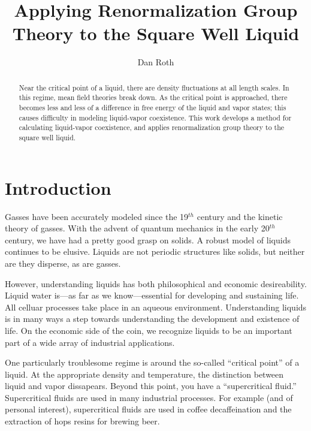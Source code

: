 \documentclass[letterpaper,twocolumn,amsmath,amssymb,prb]{revtex4-1}
\newcommand{\1}{\ensuremath{\textbf{r}_1}}
\newcommand{\2}{\ensuremath{\textbf{r}_2}}
\newcommand{\3}{\ensuremath{\textbf{r}_3}}
\newcommand{\4}{\ensuremath{\textbf{r}_4}}
\begin{document}
\title{Applying Renormalization Group Theory to the Square Well Liquid}

\author{Dan Roth}

\begin{abstract}

Near the critical point of a liquid, there are density fluctuations at
all length scales. In this regime, mean field theories break down. As
the critical point is approached, there becomes less and less of a
difference in free energy of the liquid and vapor states; this causes
difficulty in modeling liquid-vapor coexistence. This work develops a
method for calculating liquid-vapor coexistence, and applies
renormalization group theory to the square well liquid.

\end{abstract}

\maketitle

\section{Introduction}

Gasses have been accurately modeled since the 19$^{th}$
century\cite{Lederman92} and the kinetic theory of gasses. With the
advent of quantum mechanics in the early 20$^{th}$ century, we have
had a pretty good grasp on solids. A robust model of liquids continues
to be elusive. Liquids are not periodic structures like solids, but
neither are they disperse, as are gasses.

However, understanding liquids has both philosophical and economic
desireability. Liquid water is---as far as we know---essential for
developing and sustaining life. All celluar processes take place in an
aqueous environment. Understanding liquids is in many ways a step
towards understanding the development and existence of life. On the
economic side of the coin, we recognize liquids to be an important
part of a wide array of industrial applications.

One particularly troublesome regime is around the so-called ``critical
point'' of a liquid. At the appropriate density and temperature, the
distinction between liquid and vapor dissapears. Beyond this point,
you have a ``supercritical fluid.'' Supercritical fluids are used in
many industrial processes\cite{Perrut00}. For example (and of personal
interest), supercritical fluids are used in coffee decaffeination and
the extraction of hops resins for brewing beer.
\end{document}
